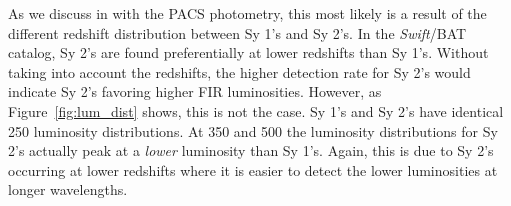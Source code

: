 As we discuss in \citet{Melendez:2014yu} with the PACS photometry, this most likely is a result of the different redshift distribution between Sy 1's and Sy 2's. In the \textit{Swift}/BAT catalog, Sy 2's are found preferentially at lower redshifts than Sy 1's. Without taking into account the redshifts, the higher detection rate for Sy 2's would indicate Sy 2's favoring higher FIR luminosities. However, as Figure~\ref{fig:lum_dist} shows, this is not the case. Sy 1's and Sy 2's have identical 250 \um{} luminosity distributions. At 350 and 500 \um{} the luminosity distributions for Sy 2's actually peak at a \textit{lower} luminosity than Sy 1's. Again, this is due to Sy 2's occurring at lower redshifts where it is easier to detect the lower luminosities at longer wavelengths.